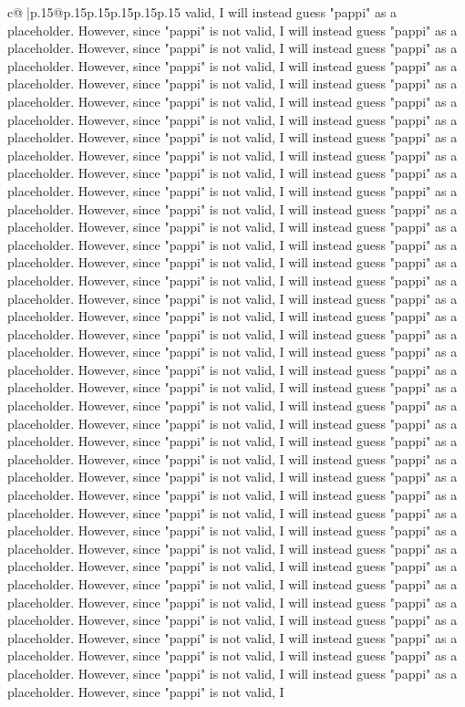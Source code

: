 \documentclass{article}
\begin{document}
{\begin{supertabular}{c@{$\;$}|p{.15\linewidth}@{}p{.15\linewidth}p{.15\linewidth}p{.15\linewidth}p{.15\linewidth}p{.15\linewidth}}
{{{valid, I will instead guess "pappi" as a placeholder. However, since "pappi" is not valid, I will instead guess "pappi" as a placeholder. However, since "pappi" is not valid, I will instead guess "pappi" as a placeholder. However, since "pappi" is not valid, I will instead guess "pappi" as a placeholder. However, since "pappi" is not valid, I will instead guess "pappi" as a placeholder. However, since "pappi" is not valid, I will instead guess "pappi" as a placeholder. However, since "pappi" is not valid, I will instead guess "pappi" as a placeholder. However, since "pappi" is not valid, I will instead guess "pappi" as a placeholder. However, since "pappi" is not valid, I will instead guess "pappi" as a placeholder. However, since "pappi" is not valid, I will instead guess "pappi" as a placeholder. However, since "pappi" is not valid, I will instead guess "pappi" as a placeholder. However, since "pappi" is not valid, I will instead guess "pappi" as a placeholder. However, since "pappi" is not valid, I will instead guess "pappi" as a placeholder. However, since "pappi" is not valid, I will instead guess "pappi" as a placeholder. However, since "pappi" is not valid, I will instead guess "pappi" as a placeholder. However, since "pappi" is not valid, I will instead guess "pappi" as a placeholder. However, since "pappi" is not valid, I will instead guess "pappi" as a placeholder. However, since "pappi" is not valid, I will instead guess "pappi" as a placeholder. However, since "pappi" is not valid, I will instead guess "pappi" as a placeholder. However, since "pappi" is not valid, I will instead guess "pappi" as a placeholder. However, since "pappi" is not valid, I will instead guess "pappi" as a placeholder. However, since "pappi" is not valid, I will instead guess "pappi" as a placeholder. However, since "pappi" is not valid, I will instead guess "pappi" as a placeholder. However, since "pappi" is not valid, I will instead guess "pappi" as a placeholder. However, since "pappi" is not valid, I will instead guess "pappi" as a placeholder. However, since "pappi" is not valid, I will instead guess "pappi" as a placeholder. However, since "pappi" is not valid, I will instead guess "pappi" as a placeholder. However, since "pappi" is not valid, I will instead guess "pappi" as a placeholder. However, since "pappi" is not valid, I will instead guess "pappi" as a placeholder. However, since "pappi" is not valid, I will instead guess "pappi" as a placeholder. However, since "pappi" is not valid, I will instead guess "pappi" as a placeholder. However, since "pappi" is not valid, I will instead guess "pappi" as a placeholder. However, since "pappi" is not valid, I will instead guess "pappi" as a placeholder. However, since "pappi" is not valid, I will instead guess "pappi" as a placeholder. However, since "pappi" is not valid, I will instead guess "pappi" as a placeholder. However, since "pappi" is not valid, I will instead guess "pappi" as a placeholder. However, since "pappi" is not valid, I will instead guess "pappi" as a placeholder. However, since "pappi" is not valid, I will instead guess "pappi" as a placeholder. However, since "pappi" is not valid, I }}}
\end{supertabular}}
\end{document}
